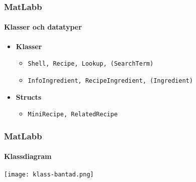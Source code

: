 \begin{frame}
  \frametitle{MatLabb}
  \framesubtitle{Klasser och datatyper}
  \begin{itemize}
  \item \textbf{Klasser}
    \begin{itemize}
    \item \texttt{Shell, Recipe, Lookup, (SearchTerm)}
    \item \texttt{InfoIngredient, RecipeIngredient, (Ingredient)}
    \end{itemize}
  \item \textbf{Structs}
    \begin{itemize}
    \item \texttt{MiniRecipe, RelatedRecipe}
    \end{itemize}
  \end{itemize}
\end{frame}

\begin{frame}[c]
  \frametitle{MatLabb}
  \framesubtitle{Klassdiagram}
  \centering
  \texttt{[image: klass-bantad.png]}
\end{frame}
